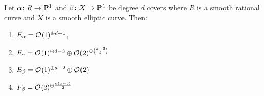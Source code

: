 \documentclass[11pt, two side, letterpaper, final]{amsart}
\renewcommand{\P}{{\bf P}}
\newcommand {\from}{\colon}
\begin{document}
\begin{lemma}\label{lowG}
Let $\alpha \colon R \to \P^1$ and $\beta \from X \to \P^1$ be degree $d$ covers where $R$ is a smooth rational curve and $X$ is a smooth elliptic curve. Then:
\begin{enumerate} [label=(\alph*)]
\item \label{item-E-rational} $E_{\alpha} = {\mathcal O}(1)^{\oplus d-1}$,
\item \label{item-F-rational}  $F_{\alpha} = {\mathcal O}(1)^{\oplus d-3} \oplus {\mathcal O}(2)^{\oplus \binom{d-2}{2}}$
\item \label{item-E-elliptic} $E_{\beta} = {\mathcal O}(1)^{\oplus d-2} \oplus {\mathcal O}(2)$
\item \label{item-F-elliptic} $F_{\beta} =  {\mathcal O}(2)^{\oplus \frac{d(d-3)}{2}}$
\end{enumerate}
\end{lemma}
\end{document}
